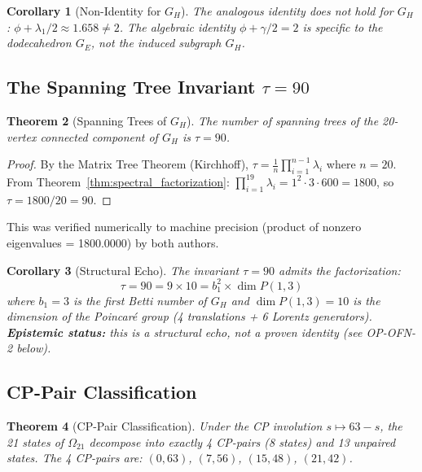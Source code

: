 \documentclass[11pt,a4paper]{article}
\theoremstyle{plain}
\newtheorem{theorem}{Theorem}[section]
\newtheorem{corollary}[theorem]{Corollary}
\theoremstyle{definition}
\theoremstyle{remark}
\begin{document}
\begin{corollary}[Non-Identity for $G_H$]
\label{cor:non_identity_GH}
The analogous identity does \textit{not} hold for $G_H$: $\phi + \lambda_1/2 \approx 1.658 \neq 2$. The algebraic identity $\phi + \gamma/2 = 2$ is specific to the dodecahedron $G_E$, not the induced subgraph $G_H$.
\end{corollary}

\subsection{The Spanning Tree Invariant \texorpdfstring{$\tau = 90$}{tau = 90}}
\label{sec:spanning_trees}

\begin{theorem}[Spanning Trees of $G_H$]
\label{thm:spanning_trees}
The number of spanning trees of the 20-vertex connected component of $G_H$ is $\tau = 90$.
\end{theorem}

\begin{proof}
By the Matrix Tree Theorem (Kirchhoff), $\tau = \frac{1}{n}\prod_{i=1}^{n-1}\lambda_i$ where $n = 20$. From Theorem~\ref{thm:spectral_factorization}: $\prod_{i=1}^{19}\lambda_i = 1^2 \cdot 3 \cdot 600 = 1800$, so $\tau = 1800/20 = 90$.
\end{proof}

This was verified numerically to machine precision (product of nonzero eigenvalues = 1800.0000) by both authors.

\begin{corollary}[Structural Echo]
\label{cor:structural_echo}
The invariant $\tau = 90$ admits the factorization:
\[
\tau = 90 = 9 \times 10 = b_1^2 \times \dim P(1,3)
\]
where $b_1 = 3$ is the first Betti number of $G_H$ and $\dim P(1,3) = 10$ is the dimension of the Poincaré group (4 translations + 6 Lorentz generators). \textbf{Epistemic status:} this is a \textit{structural echo}, not a proven identity (see OP-OFN-2 below).
\end{corollary}

\subsection{CP-Pair Classification}
\label{sec:cp_pairs}

\begin{theorem}[CP-Pair Classification]
\label{thm:cp_classification}
Under the CP involution $s \mapsto 63 - s$, the 21 states of $\Omega_{21}$ decompose into exactly 4 CP-pairs (8 states) and 13 unpaired states. The 4 CP-pairs are: $(0,63)$, $(7,56)$, $(15,48)$, $(21,42)$.
\end{theorem}
\end{document}
